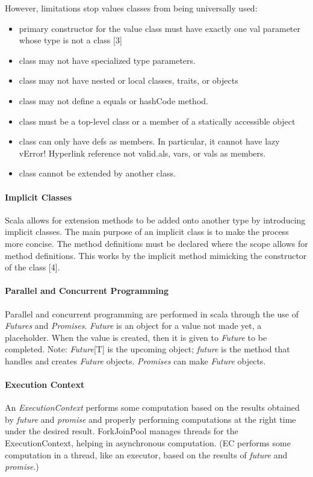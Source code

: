 \documentclass[12pt]{article}
\begin{document}
However, limitations stop values classes from being universally used:

		\begin{itemize}
			\item primary constructor for the value class must have exactly one val parameter whose type is not a class [3]
			\item class may not have specialized type parameters.
			\item class may not have nested or local classes, traits, or objects
			\item class may not define a equals or hashCode method.
			\item class must be a top-level class or a member of a statically accessible object
			\item class can only have defs as members. In particular, it cannot have lazy vError! Hyperlink reference not valid.als, vars, or vals as members.
			\item class cannot be extended by another class.
		\end{itemize}

		\paragraph{Implicit Classes}Scala allows for extension methods to be added onto another type by introducing implicit classes. The main purpose of an implicit class is to make the process more concise. The method definitions must be declared where the scope allows for method definitions. This works by the implicit method mimicking the constructor of the class [4].

		\paragraph{Parallel and Concurrent Programming}Parallel and concurrent programming are performed in scala through the use of \textit{Futures} and \textit{Promises}. \textit{Future} is an object for a value not made yet, a placeholder.  When the value is created, then it is given to \textit{Future} to be completed.  Note: \textit{Future}[T] is the upcoming object; \textit{future} is the method that handles and creates \textit{Future} objects. \textit{Promises} can make \textit{Future} objects.
		\paragraph{Execution Context}An \textit{ExecutionContext} performs some computation based on the results obtained by \textit{future} and \textit{promise} and properly performing computations at the right time under the desired result.  ForkJoinPool manages threads for the ExecutionContext, helping in asynchronous computation. (EC performs some computation in a thread, like an executor, based on the results of \textit{future} and \textit{promise}.)
\end{document}
